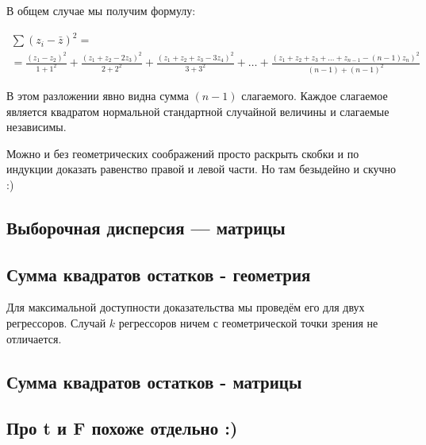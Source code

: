 \documentclass[11pt,russian,]{article}
\newcommand{\1}{\mathbbm{1}}
\begin{document}
В общем случае мы получим формулу:

\begin{multline}
\nonumber
\sum (z_i - \bar z)^2 = \\
= \frac{(z_1 - z_2)^2}{1+1^2} + \frac{(z_1 + z_2 - 2z_3)^2}{2+2^2} + \frac{(z_1 + z_2 + z_3 - 3z_4)^2}{3+3^2} + \ldots + \frac{(z_1 + z_2 + z_3 + \ldots + z_{n-1} - (n-1)z_n)^2}{(n-1)+(n-1)^2}
\end{multline}

В этом разложении явно видна сумма \((n-1)\) слагаемого. Каждое
слагаемое является квадратом нормальной стандартной случайной величины и
слагаемые независимы.

Можно и без геометрических соображений просто раскрыть скобки и по
индукции доказать равенство правой и левой части. Но там безыдейно и
скучно :)

\subsection{Выборочная дисперсия --- матрицы}\label{--}

\subsection{Сумма квадратов остатков - геометрия}\label{-----}

Для максимальной доступности доказательства мы проведём его для двух
регрессоров. Случай \(k\) регрессоров ничем с геометрической точки
зрения не отличается.

\subsection{Сумма квадратов остатков - матрицы}\label{-----}

\subsection{Про t и F похоже отдельно :)}\label{-t--f--}

\printbibliography
\end{document}
